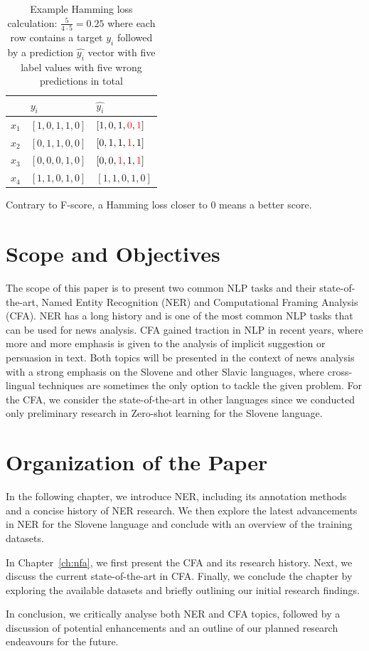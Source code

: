 \begin{table}[htb]
    \caption{Example Hamming loss calculation: $\frac{5}{4 \cdot 5} = 0.25$ where each row contains a target $y_i$ followed by a prediction $\hat{y_i}$ vector with five label values with five wrong predictions in total}
	\label{tab:hamming}
	\centering
    \begin{tabular}{lll}
        \hline
        &$y_i$&$\hat{y_i}$\\
        \hline
        $x_1$&$[1, 0, 1, 1, 0]$&$[1, 0, 1, \textcolor{red}{0}, \textcolor{red}{1}]$\\
        $x_2$&$[0, 1, 1, 0, 0]$&$[0, 1, 1, \textcolor{red}{1}, 1]$\\
        $x_3$&$[0, 0, 0, 1, 0]$&$[0, 0, \textcolor{red}{1}, 1, \textcolor{red}{1}]$\\
        $x_4$&$[1, 1, 0, 1, 0]$&$[1, 1, 0, 1, 0]$\\
        \hline
    \end{tabular}
\end{table}

Contrary to F-score, a Hamming loss closer to 0 means a better score.


\section{Scope and Objectives}
The scope of this paper is to present two common NLP tasks and their state-of-the-art, Named Entity Recognition (NER) and Computational Framing Analysis (CFA). 
NER has a long history and is one of the most common NLP tasks that can be used for news analysis. 
CFA gained traction in NLP in recent years, where more and more emphasis is given to the analysis of implicit suggestion or persuasion in text.
Both topics will be presented in the context of news analysis with a strong emphasis on the Slovene and other Slavic languages, where cross-lingual techniques are sometimes the only option to tackle the given problem. 
For the CFA, we consider the state-of-the-art in other languages since we conducted only preliminary research in Zero-shot learning for the Slovene language.

\section{Organization of the Paper}

In the following chapter, we introduce NER, including its annotation methods and a concise history of NER research. 
We then explore the latest advancements in NER for the Slovene language and conclude with an overview of the training datasets.

In Chapter~\ref{ch:nfa}, we first present the CFA and its research history. 
Next, we discuss the current state-of-the-art in CFA.
Finally, we conclude the chapter by exploring the available datasets and briefly outlining our initial research findings.

In conclusion, we critically analyse both NER and CFA topics, followed by a discussion of potential enhancements and an outline of our planned research endeavours for the future.